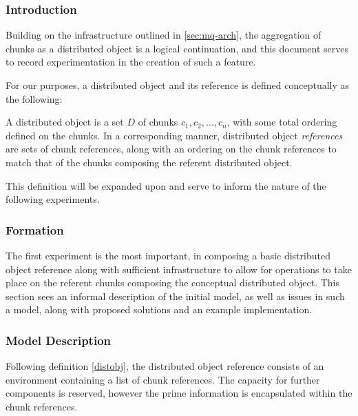 \subsubsection{Introduction}

Building on the infrastructure outlined in \ref{sec:mq-arch}, the aggregation of chunks as a distributed object
is a logical continuation, and this document serves to record experimentation
in the creation of such a feature.

For our purposes, a distributed object and its reference is defined
conceptually as the following:

\begin{definition}
	\label{distobj}
	A distributed object is a set \(D\) of chunks \(c_1, c_2, \dots, c_n\),
	with some total ordering defined on the chunks. 
	In a corresponding manner, distributed object \textit{references} are
	sets of chunk references, along with an ordering on the chunk
	references to match that of the chunks composing the referent
	distributed object.
\end{definition}

This definition will be expanded upon and serve to inform the nature of the
following experiments.

\subsubsection{Formation}

The first experiment is the most important, in composing a basic distributed
object reference along with sufficient infrastructure to allow for operations
to take place on the referent chunks composing the conceptual distributed
object.
This section sees an informal description of the initial model, as well as
issues in such a model, along with proposed solutions and an example
implementation.

\subsubsection{Model Description}

Following definition \cref{distobj}, the distributed
object reference consists of an environment containing a list of chunk
references.
The capacity for further components is reserved, however the prime information
is encapsulated within the chunk references.

